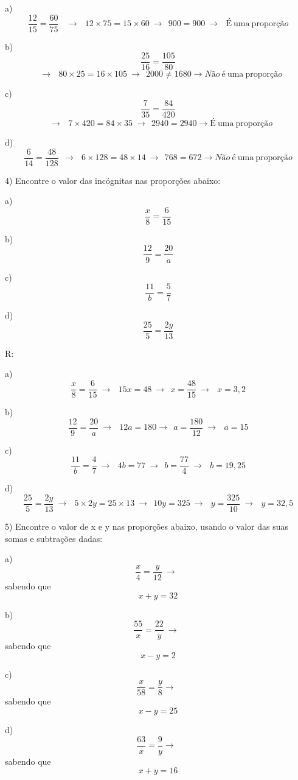 a)
\[\frac{12}{15} = \frac{60}{75}\ \ \ \  \rightarrow \ \ \ 12 \times 75 = 15 \times 60\  \rightarrow \ \ 900 = 900\  \rightarrow \ \ \ É\ \text{uma}\ \text{pr}\text{opor}ção\]

b) \[\frac{25}{16} = \frac{105}{80}\]
\[\ \ \  \rightarrow \ \ \ 80 \times 25 = 16 \times 105\  \rightarrow \ \ 2000 \neq 1680 \rightarrow Não\ é\ \text{uma}\ \text{propor}ção\]

c) \[\frac{7}{35} = \frac{84}{420}\]
\[\ \ \  \rightarrow \ \ \ 7 \times 420 = 84 \times 35\  \rightarrow \ \ 2940 = 2940 \rightarrow É\ \text{uma}\ \text{propor}ção\]

d)
\[\frac{6}{14} = \frac{48}{128}\ \  \rightarrow \ \ \ 6 \times 128 = 48 \times 14\  \rightarrow \ \ 768 = 672 \rightarrow Não\ é\ \text{uma}\ \text{propor}ção\]

4) Encontre o valor das incógnitas nas proporções abaixo:

a) \[\frac{x}{8} = \frac{6}{15}\]

b) \[\frac{12}{9} = \frac{20}{a}\]

c) \[\frac{11}{b} = \frac{5}{7}\]

d) \[\frac{25}{5} = \frac{2y}{13}\]

R:

a)
\[\frac{x}{8} = \frac{6}{15}\  \rightarrow \ \ \ 15x = 48\  \rightarrow \ \ x = \frac{48}{15}\  \rightarrow \ \ \ x = 3,2\]

b)
\[\frac{12}{9} = \frac{20}{a}\  \rightarrow \ \ \ 12a = 180 \rightarrow \ \ a = \frac{180}{12}\  \rightarrow \ \ \ a = 15\]

c)
\[\frac{11}{b} = \frac{4}{7}\  \rightarrow \ \ \ 4b = 77\  \rightarrow \ \ b = \frac{77}{4}\  \rightarrow \ \ \ b = 19,25\]

d)
\[\frac{25}{5} = \frac{2y}{13}\  \rightarrow \ \ \ 5 \times 2y = 25 \times 13\  \rightarrow \ \ 10y = 325\  \rightarrow \ \ \ y = \frac{325}{10}\  \rightarrow \ \ \ y = 32,5\]

5) Encontre o valor de x e y nas proporções abaixo, usando o valor das
suas somas e subtrações dadas:

a) \[\frac{x}{4} = \frac{y}{12}\  \rightarrow \ \ \]sabendo que
\[x + y = 32\]

b) \[\frac{55}{x} = \frac{22}{y}\  \rightarrow \ \ \]sabendo que
\[x - y = 2\]

c) \[\frac{x}{58} = \frac{y}{8} \rightarrow \ \ \]sabendo que
\[x - y = 25\]

d) \[\frac{63}{x} = \frac{9}{y} \rightarrow \ \ \]sabendo que
\[x + y = 16\]

